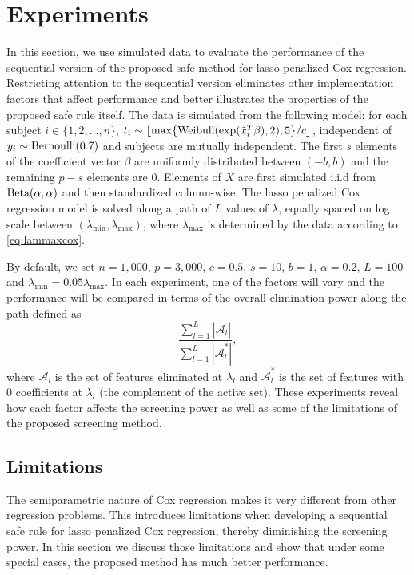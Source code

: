 \section{Experiments}

In this section, we use simulated data to evaluate the performance of the sequential version of the proposed safe method for lasso penalized Cox regression. Restricting attention to the sequential version eliminates other implementation factors that affect performance and better illustrates the properties of the proposed safe rule itself. The data is simulated from the following model: for each subject $i\in\{1,2,...,n\}$, $t_i \sim \lfloor\max\{\textnormal{Weibull}(\exp(\tilde{x}_i^T \beta),2), 5\}/c\rfloor $, independent of $y_i \sim \textnormal{Bernoulli}(0.7)$ and subjects are mutually independent. The first $s$ elements of the coefficient vector $\beta$ are uniformly distributed between $(-b,b)$ and the remaining $p-s$ elements are $0$. Elements of $X$ are first simulated i.i.d from $\textnormal{Beta}(\alpha,\alpha)$ and then standardized column-wise. The lasso penalized Cox regression model is solved along a path of $L$ values of $\lambda$, equally spaced on log scale between $(\lambda_{\min},\lambda_{\max})$, where $\lambda_{\max}$ is determined by the data according to \eqref{eq:lammaxcox}. 

By default, we set $n=1,000$, $p=3,000$, $c=0.5$, $s=10$, $b=1$, $\alpha=0.2$, $L=100$ and $\lambda_{\min}=0.05\lambda_{\max}$. In each experiment, one of the factors will vary and the performance will be compared in terms of the overall elimination power along the path defined as
\begin{equation}
    \frac{\sum_{l=1}^L|\bar{\mathcal{A}}_l|}{\sum_{l=1}^L|\bar{\mathcal{A}}^*_l|},
\end{equation}
where $\bar{\mathcal{A}}_l$ is the set of features eliminated at $\lambda_l$ and $\bar{\mathcal{A}}^*_l$ is the set of features with 0 coefficients at $\lambda_l$ (the complement of the active set). These experiments reveal how each factor affects the screening power as well as some of the limitations of the proposed screening method.

\subsection{Limitations}
\label{sec:lim}

The semiparametric nature of Cox regression makes it very different from other regression problems. This introduces limitations when developing a sequential safe rule for lasso penalized Cox regression, thereby diminishing the screening power. In this section we discuss those limitations and show that under some special cases, the proposed method has much better performance.

